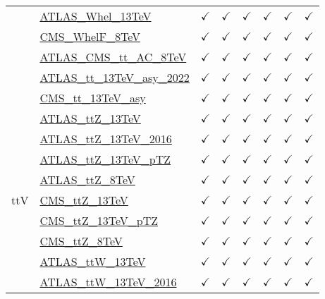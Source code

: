 \documentclass{article}
\begin{document}
\begin{longtable}{|c|l|c|c|c|c|c|c|}
 & \href{https://arxiv.org}{ATLAS_Whel_13TeV}  & $\checkmark$ & $\checkmark$ & $\checkmark$ & $\checkmark$ & $\checkmark$ & $\checkmark$\\ \cline{2-8}
 & \href{https://arxiv.org}{CMS_WhelF_8TeV}  & $\checkmark$ & $\checkmark$ & $\checkmark$ & $\checkmark$ & $\checkmark$ & $\checkmark$\\ \cline{2-8}
 & \href{https://arxiv.org}{ATLAS_CMS_tt_AC_8TeV}  & $\checkmark$ & $\checkmark$ & $\checkmark$ & $\checkmark$ & $\checkmark$ & $\checkmark$\\ \cline{2-8}
 & \href{https://arxiv.org}{ATLAS_tt_13TeV_asy_2022}  & $\checkmark$ & $\checkmark$ & $\checkmark$ & $\checkmark$ & $\checkmark$ & $\checkmark$\\ \cline{2-8}
 & \href{https://arxiv.org}{CMS_tt_13TeV_asy}  & $\checkmark$ & $\checkmark$ & $\checkmark$ & $\checkmark$ & $\checkmark$ & $\checkmark$
\\ \hline
\multirow{12}{*}{ttV}
 & \href{https://arxiv.org}{ATLAS_ttZ_13TeV}  & $\checkmark$ & $\checkmark$ & $\checkmark$ & $\checkmark$ & $\checkmark$ & $\checkmark$\\ \cline{2-8}
 & \href{https://arxiv.org}{ATLAS_ttZ_13TeV_2016}  & $\checkmark$ & $\checkmark$ & $\checkmark$ & $\checkmark$ & $\checkmark$ & $\checkmark$\\ \cline{2-8}
 & \href{https://arxiv.org}{ATLAS_ttZ_13TeV_pTZ}  & $\checkmark$ & $\checkmark$ & $\checkmark$ & $\checkmark$ & $\checkmark$ & $\checkmark$\\ \cline{2-8}
 & \href{https://arxiv.org}{ATLAS_ttZ_8TeV}  & $\checkmark$ & $\checkmark$ & $\checkmark$ & $\checkmark$ & $\checkmark$ & $\checkmark$\\ \cline{2-8}
 & \href{https://arxiv.org}{CMS_ttZ_13TeV}  & $\checkmark$ & $\checkmark$ & $\checkmark$ & $\checkmark$ & $\checkmark$ & $\checkmark$\\ \cline{2-8}
 & \href{https://arxiv.org}{CMS_ttZ_13TeV_pTZ}  & $\checkmark$ & $\checkmark$ & $\checkmark$ & $\checkmark$ & $\checkmark$ & $\checkmark$\\ \cline{2-8}
 & \href{https://arxiv.org}{CMS_ttZ_8TeV}  & $\checkmark$ & $\checkmark$ & $\checkmark$ & $\checkmark$ & $\checkmark$ & $\checkmark$\\ \cline{2-8}
 & \href{https://arxiv.org}{ATLAS_ttW_13TeV}  & $\checkmark$ & $\checkmark$ & $\checkmark$ & $\checkmark$ & $\checkmark$ & $\checkmark$\\ \cline{2-8}
 & \href{https://arxiv.org}{ATLAS_ttW_13TeV_2016}  & $\checkmark$ & $\checkmark$ & $\checkmark$ & $\checkmark$ & $\checkmark$ & $\checkmark$\\ \cline{2-8}

\end{longtable}
\end{document}
